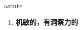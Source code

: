 
\begin{frame}
{\huge astute}
\begin{center}
\begin{enumerate}\Large
  \item \textbf{机敏的，有洞察力的}
\end{enumerate}
\end{center}
\end{frame}
